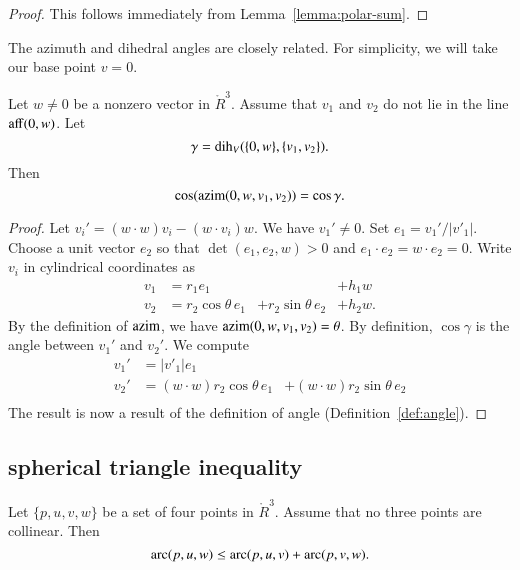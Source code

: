 \begin{proof} This follows immediately from 
Lemma~\ref{lemma:polar-sum}.
\end{proof}


The azimuth and dihedral angles are closely related.  For simplicity,
we will take our base point $v=0$.

\begin{lemma}  Let $w\ne 0$ be a nonzero vector in $\ring{R}^3$.
  Assume that $v_1$ and $v_2$ do not lie in the line ${\operatorname{aff}}(0,w)$.
Let
  $$\gamma = \operatorname{dih}_V(\{0,w\},\{v_1,v_2\}).$$
  Then
    $$
    \cos({\operatorname{azim}}(0,w,v_1,v_2)) = \cos\gamma.
    $$
\end{lemma}

\begin{proof}
Let $v_i' = (w\cdot w) v_i - (w\cdot v_i) w$.  
We have $v_1'\ne 0$.  Set $e_1 = v_1'/|v'_1|$.  Choose a unit vector
$e_2$ so that $\det(e_1,e_2,w)>0$ and $e_1\cdot e_2 = w\cdot e_2=0$.
Write $v_i$ in cylindrical coordinates as 
   $$
   \begin{array}{lllll}
     v_1 &= r_1 e_1 &    &+h_1 w\\
     v_2 &= r_2 \cos\theta\, e_1 &+ r_2 \sin\theta\, e_2 &+ h_2 w.
    \end{array}
   $$
By the definition of ${\operatorname{azim}}$, we have ${\operatorname{azim}}(0,w,v_1,v_2)=\theta$.  By definition, $\cos\gamma$ is the angle between $v_1'$ and $v_2'$.
We compute
   $$
   \begin{array}{lll}
     v_1' &= |v'_1| e_1 \\
     v_2' &= (w\cdot w) r_2 \cos\theta\, e_1 
       &+ (w\cdot w) r_2 \sin\theta\, e_2 \\
     \end{array}
   $$
The result is now a result of the definition of angle 
(Definition~\ref{def:angle}).
\end{proof}




\subsection{spherical triangle inequality}

\begin{lemma}\label{lemma:sph-tri-ineq}
Let $\{p,u,v,w\}$ be a set of four points in $\ring{R}^3$.
Assume that no three points are collinear.
Then
   $$
   \operatorname{arc}(p,u,w) \le \operatorname{arc}(p,u,v) + \operatorname{arc}(p,v,w).
   $$
\end{lemma}

